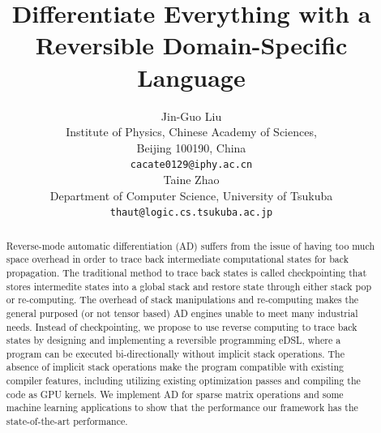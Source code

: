 \documentclass{article}
\newcommand{\<}{\langle}
\renewcommand{\>}{\rangle}
\theoremstyle{definition}\newtheorem{definition}{\textit{Definition}}
\begin{document}
\title{Differentiate Everything with a Reversible Domain-Specific Language}

\author{Jin-Guo Liu\\
Institute of Physics, Chinese Academy of Sciences,\\Beijing 100190, China\\
\texttt{cacate0129@iphy.ac.cn}\\
\And
Taine Zhao\\
Department of Computer Science, University of Tsukuba\\
\texttt{thaut@logic.cs.tsukuba.ac.jp}\\
}



\maketitle

\begin{abstract}
Reverse-mode automatic differentiation (AD) suffers from the issue of having too much space overhead in order to trace back intermediate computational states for back propagation.
The traditional method to trace back states is called checkpointing that stores intermedite states into a global stack and restore state through either stack pop or re-computing.
The overhead of stack manipulations and re-computing makes the general purposed (or not tensor based) AD engines unable to meet many industrial needs.
Instead of checkpointing, we propose to use reverse computing to trace back states by designing and implementing a reversible programming eDSL, where a program can be executed bi-directionally without implicit stack operations. The absence of implicit stack operations make the program compatible with existing compiler features, including utilizing existing optimization passes and compiling the code as GPU kernels.
We implement AD for sparse matrix operations and some machine learning applications to show that the performance our framework has the state-of-the-art performance.
\end{abstract}
\end{document}
